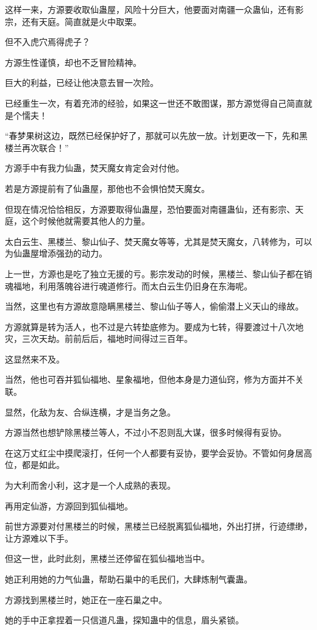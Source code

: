 \begin{this_body}
这样一来，方源要收取仙蛊屋，风险十分巨大，他要面对南疆一众蛊仙，还有影宗，还有天庭。简直就是火中取栗。

但不入虎穴焉得虎子？

方源生性谨慎，却也不乏冒险精神。

巨大的利益，已经让他决意去冒一次险。

已经重生一次，有着充沛的经验，如果这一世还不敢图谋，那方源觉得自己简直就是个懦夫！

“春梦果树这边，既然已经保护好了，那就可以先放一放。计划更改一下，先和黑楼兰再次联合！”

方源手中有我力仙蛊，焚天魔女肯定会对付他。

若是方源提前有了仙蛊屋，那他也不会惧怕焚天魔女。

但现在情况恰恰相反，方源要取得仙蛊屋，恐怕要面对南疆蛊仙，还有影宗、天庭，这个时候他就需要其他人的力量。

太白云生、黑楼兰、黎山仙子、焚天魔女等等，尤其是焚天魔女，八转修为，可以为仙蛊屋增添强劲的动力。

上一世，方源也是吃了独立无援的亏。影宗发动的时候，黑楼兰、黎山仙子都在销魂福地，利用落魄谷进行魂道修行。而太白云生仍旧身在东海呢。

当然，这里也有方源故意隐瞒黑楼兰、黎山仙子等人，偷偷潜上义天山的缘故。

方源就算是转为活人，也不过是六转垫底修为。要成为七转，得要渡过十八次地灾，三次天劫。前前后后，福地时间得过三百年。

这显然来不及。

当然，他也可吞并狐仙福地、星象福地，但他本身是力道仙窍，修为方面并不关联。

显然，化敌为友、合纵连横，才是当务之急。

方源当然也想铲除黑楼兰等人，不过小不忍则乱大谋，很多时候得有妥协。

在这万丈红尘中摸爬滚打，任何一个人都要有妥协，要学会妥协。不管如何身居高位，都是如此。

为大利而舍小利，这才是一个人成熟的表现。

再用定仙游，方源回到狐仙福地。

前世方源要对付黑楼兰的时候，黑楼兰已经脱离狐仙福地，外出打拼，行迹缥缈，让方源难以下手。

但这一世，此时此刻，黑楼兰还停留在狐仙福地当中。

她正利用她的力气仙蛊，帮助石巢中的毛民们，大肆炼制气囊蛊。

方源找到黑楼兰时，她正在一座石巢之中。

她的手中正拿捏着一只信道凡蛊，探知蛊中的信息，眉头紧锁。


\end{this_body}
